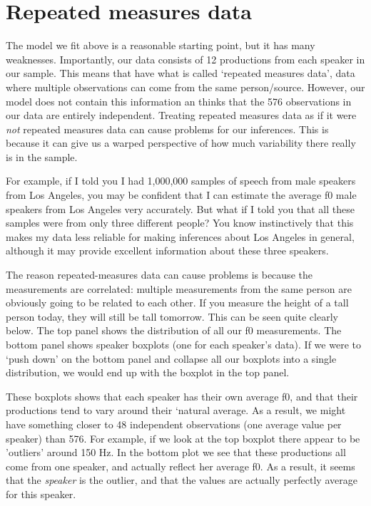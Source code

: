 \documentclass[
]{book}
\begin{document}
\hypertarget{repeated-measures-data}{%
\section{Repeated measures data}\label{repeated-measures-data}}

The model we fit above is a reasonable starting point, but it has many weaknesses. Importantly, our data consists of 12 productions from each speaker in our sample. This means that have what is called `repeated measures data', data where multiple observations can come from the same person/source. However, our model does not contain this information an thinks that the 576 observations in our data are entirely independent. Treating repeated measures data as if it were \emph{not} repeated measures data can cause problems for our inferences. This is because it can give us a warped perspective of how much variability there really is in the sample.

For example, if I told you I had 1,000,000 samples of speech from male speakers from Los Angeles, you may be confident that I can estimate the average f0 male speakers from Los Angeles very accurately. But what if I told you that all these samples were from only three different people? You know instinctively that this makes my data less reliable for making inferences about Los Angeles in general, although it may provide excellent information about these three speakers.

The reason repeated-measures data can cause problems is because the measurements are correlated: multiple measurements from the same person are obviously going to be related to each other. If you measure the height of a tall person today, they will still be tall tomorrow. This can be seen quite clearly below. The top panel shows the distribution of all our f0 measurements. The bottom panel shows speaker boxplots (one for each speaker's data). If we were to `push down' on the bottom panel and collapse all our boxplots into a single distribution, we would end up with the boxplot in the top panel.

These boxplots shows that each speaker has their own average f0, and that their productions tend to vary around their `natural average. As a result, we might have something closer to 48 independent observations (one average value per speaker) than 576. For example, if we look at the top boxplot there appear to be 'outliers' around 150 Hz. In the bottom plot we see that these productions all come from one speaker, and actually reflect her average f0. As a result, it seems that the \emph{speaker} is the outlier, and that the values are actually perfectly average for this speaker.
\end{document}
